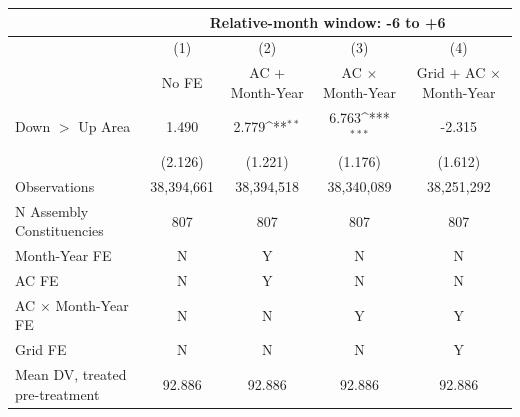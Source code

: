 {
\def\sym#1{\ifmmode^{#1}\else\(^{#1}\)\fi}
\begin{tabular}{l*{4}{c}}
\hline
&\multicolumn{4}{c}{Relative-month window: -6 to +6} \\ \hline
            &\multicolumn{1}{c}{(1)}&\multicolumn{1}{c}{(2)}&\multicolumn{1}{c}{(3)}&\multicolumn{1}{c}{(4)}\\
            &\multicolumn{1}{c}{No FE}&\multicolumn{1}{c}{AC + Month-Year}&\multicolumn{1}{c}{AC $\times$ Month-Year}&\multicolumn{1}{c}{Grid + AC $\times$ Month-Year}\\
\hline
Down $>$ Up Area&       1.490         &       2.779\sym{**} &       6.763\sym{***}&      -2.315         \\
            &     (2.126)         &     (1.221)         &     (1.176)         &     (1.612)         \\
\hline
Observations&  38,394,661         &  38,394,518         &  38,340,089         &  38,251,292         \\
N Assembly Constituencies&         807         &         807         &         807         &         807         \\
Month-Year FE&           N         &           Y         &           N         &           N         \\
AC FE       &           N         &           Y         &           N         &           N         \\
AC $\times$ Month-Year FE&           N         &           N         &           Y         &           Y         \\
Grid FE     &           N         &           N         &           N         &           Y         \\
Mean DV, treated pre-treatment&      92.886         &      92.886         &      92.886         &      92.886         \\
\hline
\end{tabular}
}

